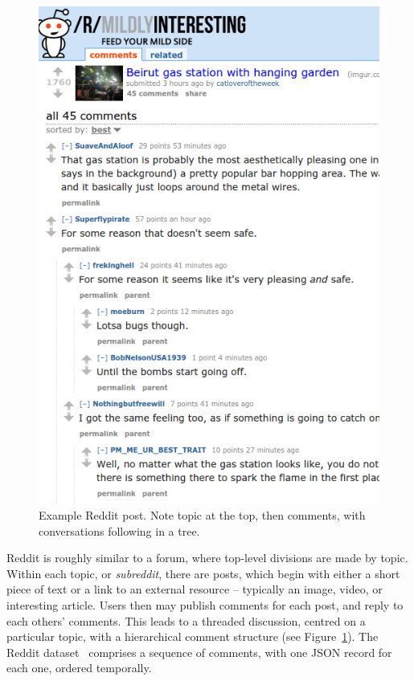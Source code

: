 \documentclass[acmsmall]{acmart}
\begin{document}
\begin{figure}
\centering
\includegraphics[width=0.95\columnwidth]{reddit-example.png}
\caption{Example Reddit post. Note topic at the top, then comments, with conversations following in a tree.}
\label{fig:reddit-example}
\end{figure}

Reddit is roughly similar to a forum, where top-level divisions are made by topic.
Within each topic, or {\em subreddit}, there are posts, which begin with either a short piece of text or a link to an external resource -- typically an image, video, or interesting article.
Users then may publish comments for each post, and reply to each others' comments.
This leads to a threaded discussion, centred on a particular topic, with a hierarchical comment structure (see Figure~\ref{fig:reddit-example}).
The Reddit dataset~\cite{reddit-data} comprises a sequence of comments, with one JSON record for each one, ordered temporally.
\end{document}
